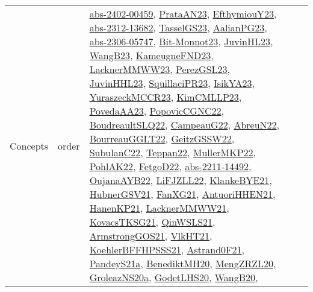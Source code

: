 {\begin{longtable}{lp{3cm}>{\raggedright}p{6cm}>{\raggedright}p{6cm}p{8cm}}
Concepts & order & \href{articles/abs-2402-00459.pdf}{abs-2402-00459}\cite{abs-2402-00459}, \href{articles/PrataAN23.pdf}{PrataAN23}\cite{PrataAN23}, \href{papers/EfthymiouY23.pdf}{EfthymiouY23}\cite{EfthymiouY23}, \href{articles/abs-2312-13682.pdf}{abs-2312-13682}\cite{abs-2312-13682}, \href{papers/TasselGS23.pdf}{TasselGS23}\cite{TasselGS23}, \href{papers/AalianPG23.pdf}{AalianPG23}\cite{AalianPG23}, \href{articles/abs-2306-05747.pdf}{abs-2306-05747}\cite{abs-2306-05747}, \href{papers/Bit-Monnot23.pdf}{Bit-Monnot23}\cite{Bit-Monnot23}, \href{papers/JuvinHL23.pdf}{JuvinHL23}\cite{JuvinHL23}, \href{papers/WangB23.pdf}{WangB23}\cite{WangB23}, \href{papers/KameugneFND23.pdf}{KameugneFND23}\cite{KameugneFND23}, \href{articles/LacknerMMWW23.pdf}{LacknerMMWW23}\cite{LacknerMMWW23}, \href{papers/PerezGSL23.pdf}{PerezGSL23}\cite{PerezGSL23}, \href{papers/JuvinHHL23.pdf}{JuvinHHL23}\cite{JuvinHHL23}, \href{papers/SquillaciPR23.pdf}{SquillaciPR23}\cite{SquillaciPR23}, \href{articles/IsikYA23.pdf}{IsikYA23}\cite{IsikYA23}, \href{articles/YuraszeckMCCR23.pdf}{YuraszeckMCCR23}\cite{YuraszeckMCCR23}, \href{papers/KimCMLLP23.pdf}{KimCMLLP23}\cite{KimCMLLP23}, \href{papers/PovedaAA23.pdf}{PovedaAA23}\cite{PovedaAA23}, \href{papers/PopovicCGNC22.pdf}{PopovicCGNC22}\cite{PopovicCGNC22}, \href{papers/BoudreaultSLQ22.pdf}{BoudreaultSLQ22}\cite{BoudreaultSLQ22}, \href{articles/CampeauG22.pdf}{CampeauG22}\cite{CampeauG22}, \href{articles/AbreuN22.pdf}{AbreuN22}\cite{AbreuN22}, \href{articles/BourreauGGLT22.pdf}{BourreauGGLT22}\cite{BourreauGGLT22}, \href{papers/GeitzGSSW22.pdf}{GeitzGSSW22}\cite{GeitzGSSW22}, \href{articles/SubulanC22.pdf}{SubulanC22}\cite{SubulanC22}, \href{papers/Teppan22.pdf}{Teppan22}\cite{Teppan22}, \href{articles/MullerMKP22.pdf}{MullerMKP22}\cite{MullerMKP22}, \href{articles/PohlAK22.pdf}{PohlAK22}\cite{PohlAK22}, \href{articles/FetgoD22.pdf}{FetgoD22}\cite{FetgoD22}, \href{articles/abs-2211-14492.pdf}{abs-2211-14492}\cite{abs-2211-14492}, \href{papers/OujanaAYB22.pdf}{OujanaAYB22}\cite{OujanaAYB22}, \href{papers/LiFJZLL22.pdf}{LiFJZLL22}\cite{LiFJZLL22}, \href{papers/KlankeBYE21.pdf}{KlankeBYE21}\cite{KlankeBYE21}, \href{articles/HubnerGSV21.pdf}{HubnerGSV21}\cite{HubnerGSV21}, \href{articles/FanXG21.pdf}{FanXG21}\cite{FanXG21}, \href{papers/AntuoriHHEN21.pdf}{AntuoriHHEN21}\cite{AntuoriHHEN21}, \href{papers/HanenKP21.pdf}{HanenKP21}\cite{HanenKP21}, \href{papers/LacknerMMWW21.pdf}{LacknerMMWW21}\cite{LacknerMMWW21}, \href{papers/KovacsTKSG21.pdf}{KovacsTKSG21}\cite{KovacsTKSG21}, \href{articles/QinWSLS21.pdf}{QinWSLS21}\cite{QinWSLS21}, \href{papers/ArmstrongGOS21.pdf}{ArmstrongGOS21}\cite{ArmstrongGOS21}, \href{articles/VlkHT21.pdf}{VlkHT21}\cite{VlkHT21}, \href{articles/KoehlerBFFHPSSS21.pdf}{KoehlerBFFHPSSS21}\cite{KoehlerBFFHPSSS21}, \href{papers/Astrand0F21.pdf}{Astrand0F21}\cite{Astrand0F21}, \href{articles/PandeyS21a.pdf}{PandeyS21a}\cite{PandeyS21a}, \href{articles/BenediktMH20.pdf}{BenediktMH20}\cite{BenediktMH20}, \href{articles/MengZRZL20.pdf}{MengZRZL20}\cite{MengZRZL20}, \href{papers/GroleazNS20a.pdf}{GroleazNS20a}\cite{GroleazNS20a}, \href{papers/GodetLHS20.pdf}{GodetLHS20}\cite{GodetLHS20}, \href{papers/WangB20.pdf}{WangB20}\cite{WangB20}, 
\end{longtable}}
